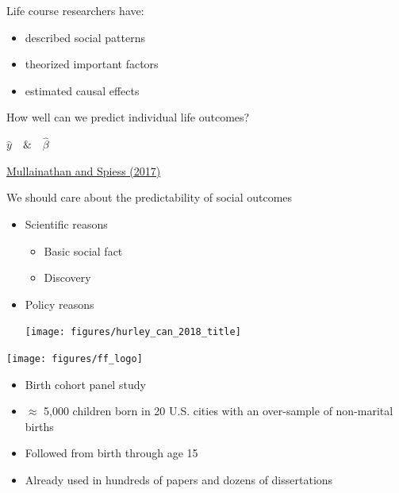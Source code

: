 \documentclass[aspectratio=169]{beamer}
\begin{document}
\begin{frame}

Life course researchers have:
\begin{itemize}
\item described social patterns
\item theorized important factors
\item estimated causal effects
\end{itemize}

\pause
\vfill
How well can we predict individual life outcomes?

\end{frame}
\begin{frame}

\begin{center}
\LARGE{
$ \hat{y} \quad \& \quad \hat{\beta}$
}
\end{center}

\vfill
\href{https://dx.doi.org/10.1257/jep.31.2.87}{Mullainathan and Spiess (2017)}
\end{frame}
\begin{frame}

We should care about the predictability of social outcomes\pause
\begin{itemize}
\item Scientific reasons \pause
\begin{itemize}
\item Basic social fact
\item Discovery \pause
\end{itemize}
\item Policy reasons
\begin{center}
\texttt{[image: figures/hurley\_can\_2018\_title]} 
\end{center}
\end{itemize}

\end{frame}
\begin{frame}

\begin{center}
\texttt{[image: figures/ff\_logo]}
\end{center}

\begin{itemize}
\item Birth cohort panel study
\item $\approx$ 5,000 children born in 20 U.S. cities with an over-sample of non-marital births
\item Followed from birth through age 15
\item Already used in hundreds of papers and dozens of dissertations
\end{itemize}

\end{frame}
\end{document}
